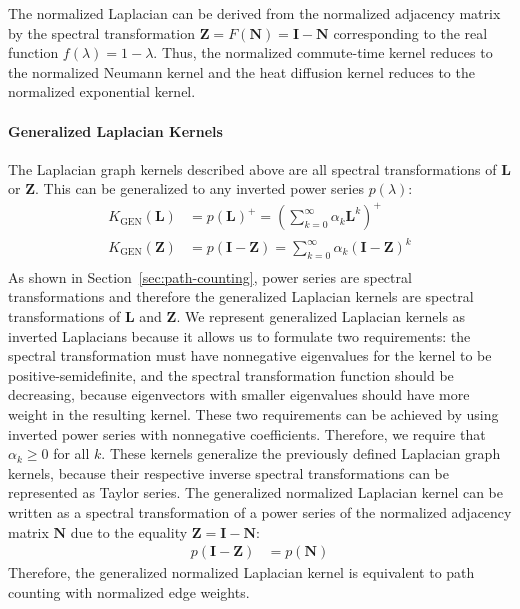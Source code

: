 \documentclass[11pt,a4paper]{book}
\begin{document}
The normalized Laplacian can be derived from the normalized
adjacency matrix by the spectral transformation $\mathbf Z =
F(\mathbf N)=\mathbf I -\mathbf N$ corresponding to the real function $f(\lambda) =
1-\lambda$.  Thus, the normalized commute-time kernel reduces to the
normalized Neumann kernel and the heat diffusion kernel reduces to
the normalized exponential kernel.  

\paragraph{Generalized Laplacian Kernels}
The Laplacian graph kernels described above are all spectral
transformations of $\mathbf L$ or $\mathbf Z$.  This can be generalized
to any inverted power series $p(\lambda)$:
\begin{align}
  K_{\mathrm{GEN}}(\mathbf L) &= p(\mathbf L)^+ = \left(
  \sum_{k=0}^\infty \alpha_k \mathbf L^k \right)^+
  \label{eq:generalized-laplacian-kernel} \\ 
  K_{\mathrm{GEN}}(\mathbf Z) &= p(\mathbf I - \mathbf Z) =
  \sum_{k=0}^\infty \alpha_k (\mathbf I - \mathbf Z)^k 
  \label{eq:generalized-normalized-laplacian-kernel} \\
\end{align}
As shown in Section~\ref{sec:path-counting}, power series are spectral
transformations 
and therefore the generalized Laplacian kernels are spectral
transformations of $\mathbf L$ and $\mathbf Z$.  
We represent generalized Laplacian kernels as inverted Laplacians
because it allows us to formulate two requirements:  the spectral
transformation must have nonnegative eigenvalues for the kernel to be
positive-semidefinite, and the spectral transformation function should
be decreasing, because eigenvectors with smaller eigenvalues should have
more weight in the resulting kernel.  These two requirements can be
achieved by using inverted power series with nonnegative
coefficients. Therefore, we require that $\alpha_k\geq 0$ for all $k$. 
These kernels generalize the previously defined Laplacian graph
kernels, because their respective inverse spectral transformations can be
represented as Taylor series. 
The generalized normalized Laplacian kernel can be written as a spectral
transformation of a power series of the normalized adjacency matrix
$\mathbf N$ due to the equality $\mathbf Z = \mathbf I - \mathbf N$:
\begin{align*}
  p(\mathbf I - \mathbf Z) &= p(\mathbf N)
\end{align*}
Therefore, the generalized normalized Laplacian kernel is equivalent to
path counting with normalized edge weights. 
\end{document}
